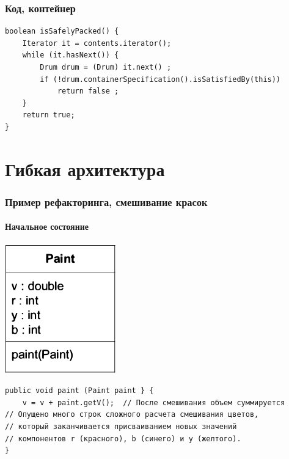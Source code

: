 \documentclass{../../slides-style}
\begin{document}
	\begin{frame}[fragile]
		\frametitle{Код, контейнер}
		\begin{verbatim}
boolean isSafelyPacked() {
    Iterator it = contents.iterator();
    while (it.hasNext()) {
        Drum drum = (Drum) it.next() ;
        if (!drum.containerSpecification().isSatisfiedBy(this))
            return false ;
    }
    return true;
}
		\end{verbatim}
\end{frame}

	\section{Гибкая архитектура}

	\begin{frame}[fragile]
		\frametitle{Пример рефакторинга, смешивание красок}
		\framesubtitle{Начальное состояние}
		\begin{center}
			\includegraphics[height=0.3\textheight]{originalPaint.png}
		\end{center}
		\begin{footnotesize}
			\begin{verbatim}
public void paint (Paint paint } {
    v = v + paint.getV();  // После смешивания объем суммируется
// Опущено много строк сложного расчета смешивания цветов,
// который заканчивается присваиванием новых значений
// компонентов r (красного), b (синего) и y (желтого).
}
			\end{verbatim}
		\end{footnotesize}
\end{frame}
\end{document}
